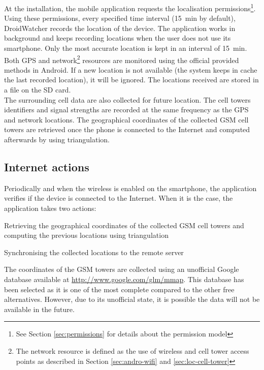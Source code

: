 At the installation, the mobile application requests the localisation permissions\footnote{See Section \ref{sec:permissions} for details about the permission model}.
Using these permissions, every specified time interval (15~min by default), DroidWatcher records the location of the device.
The application works in background and keeps recording locations when the user does not use its smartphone.
Only the most accurate location is kept in an interval of 15~min.
Both GPS and network\footnote{The network resource is defined as the use of wireless and cell tower access points as described in Section \ref{sec:andro-wifi} and \ref{sec:loc-cell-tower}} resources are monitored using the official provided methods in Android.
If a new location is not available (the system keeps in cache the last recorded location), it will be ignored.
The locations received are stored in a file on the SD card.\\

The surrounding cell data are also collected for future location.
The cell towers identifiers and signal strengths are recorded at the same frequency as the GPS and network locations.
The geographical coordinates of the collected GSM cell towers are retrieved once the phone is connected to the Internet and computed afterwards by using triangulation.

\subsection{Internet actions}
\label{sec:dw-internet-actions}

Periodically and when the wireless is enabled on the smartphone, the application verifies if the device is connected to the Internet.
When it is the case, the application takes two actions:

\begin{itemizealt}
\item Retrieving the geographical coordinates of the collected GSM cell towers and computing the previous locations using triangulation
\item Synchronising the collected locations to the remote server
\end{itemizealt}

The coordinates of the GSM towers are collected using an unofficial Google database available at \url{http://www.google.com/glm/mmap}.
This database has been selected as it is one of the most complete compared to the other free alternatives.
However, due to its unofficial state, it is possible the data will not be available in the future.\\

